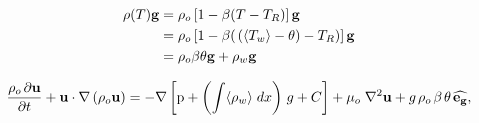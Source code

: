 \begin{equation}
\begin{aligned}
\rho(T) \mathbf{g} &= \rho_o \left[ 1 - \beta (T - T_R) \right] \mathbf{g} \\
				   &= \rho_o \left[ 1 - \beta ( \hspace{0.5mm} (\langle T_w \rangle - \theta) - T_R) \right] \mathbf{g} \\
 		           &= \rho_o \beta \theta \mathbf{g} + \rho_w \mathbf{g}
\end{aligned}
\label{eq:bussinesq}
\end{equation}

\begin{equation}
\frac{ \rho_o \hspace{0.5mm} \partial \mathbf{u}}{\partial t} + \mathbf{u} \cdot \nabla  \left( \rho_o \mathbf{u} \right) = -\nabla \left[ \text{p} + \left( \int \langle \rho_{w} \rangle \hspace{1mm} dx \right) \hspace{0.5mm} g + C \right] + \mu_o \hspace{1mm} {\nabla}^2 \mathbf{u}  + g \hspace{0.5mm} \rho_o \hspace{0.5mm} \beta \hspace{0.5mm} \theta \hspace{0.5mm} \mathbf{\widehat{e_g}},
\label{eq:mom_rewrite}  
\end{equation}


